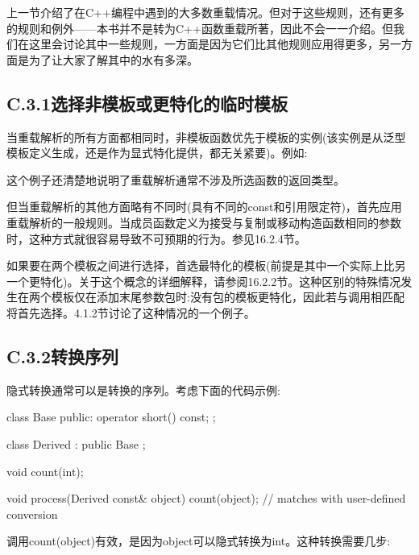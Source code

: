 
上一节介绍了在C++编程中遇到的大多数重载情况。但对于这些规则，还有更多的规则和例外——本书并不是转为C++函数重载所著，因此不会一一介绍。但我们在这里会讨论其中一些规则，一方面是因为它们比其他规则应用得更多，另一方面是为了让大家了解其中的水有多深。

\subsection{C.3.1\hspace{0.2cm}选择非模板或更特化的临时模板}

当重载解析的所有方面都相同时，非模板函数优先于模板的实例(该实例是从泛型模板定义生成，还是作为显式特化提供，都无关紧要)。例如:


这个例子还清楚地说明了重载解析通常不涉及所选函数的返回类型。

但当重载解析的其他方面略有不同时(具有不同的const和引用限定符)，首先应用重载解析的一般规则。当成员函数定义为接受与复制或移动构造函数相同的参数时，这种方式就很容易导致不可预期的行为。参见16.2.4节。

如果要在两个模板之间进行选择，首选最特化的模板(前提是其中一个实际上比另一个更特化)。关于这个概念的详细解释，请参阅16.2.2节。这种区别的特殊情况发生在两个模板仅在添加末尾参数包时:没有包的模板更特化，因此若与调用相匹配将首先选择。4.1.2节讨论了这种情况的一个例子。

\subsection{C.3.2\hspace{0.2cm}转换序列}

隐式转换通常可以是转换的序列。考虑下面的代码示例:

\begin{cpp}
class Base {
	public:
	operator short() const;
};

class Derived : public Base {
};

void count(int);

void process(Derived const& object)
{
	count(object); // matches with user-defined conversion
}
\end{cpp}

调用count(object)有效，是因为object可以隐式转换为int。这种转换需要几步:

